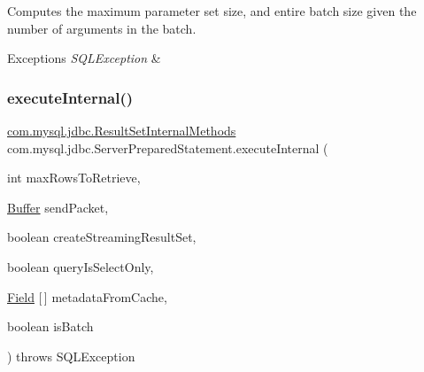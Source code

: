 Computes the maximum parameter set size, and entire batch size given the number of arguments in the batch.


\begin{DoxyExceptions}{Exceptions}
{\em S\+Q\+L\+Exception} & \\
\hline
\end{DoxyExceptions}
\mbox{\label{classcom_1_1mysql_1_1jdbc_1_1_server_prepared_statement_ab1c4ba57b38c1e90faeb9e29097f2fd2}} 
\subsubsection{\texorpdfstring{execute\+Internal()}{executeInternal()}}
{\footnotesize\ttfamily \mbox{\hyperlink{interfacecom_1_1mysql_1_1jdbc_1_1_result_set_internal_methods}{com.\+mysql.\+jdbc.\+Result\+Set\+Internal\+Methods}} com.\+mysql.\+jdbc.\+Server\+Prepared\+Statement.\+execute\+Internal (\begin{DoxyParamCaption}\item[{int}]{max\+Rows\+To\+Retrieve,  }\item[{\mbox{\hyperlink{classcom_1_1mysql_1_1jdbc_1_1_buffer}{Buffer}}}]{send\+Packet,  }\item[{boolean}]{create\+Streaming\+Result\+Set,  }\item[{boolean}]{query\+Is\+Select\+Only,  }\item[{\mbox{\hyperlink{classcom_1_1mysql_1_1jdbc_1_1_field}{Field}} \mbox{[}$\,$\mbox{]}}]{metadata\+From\+Cache,  }\item[{boolean}]{is\+Batch }\end{DoxyParamCaption}) throws S\+Q\+L\+Exception\hspace{0.3cm}{\ttfamily [protected]}}

